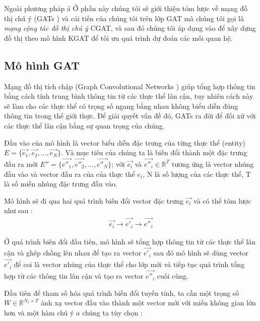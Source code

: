 Ngoài phương pháp á
Ở phần này chúng tôi sẽ giới thiệu tóm lược về mạng đồ thị chú ý (GATs \cite{velivckovic2017graph}) và cải tiến của chúng tôi trên lớp GAT mà chúng tôi gọi là \textit{mạng cộng tác đồ thị chú ý} CGAT, và sau đó chúng tôi áp dụng vào để xây dựng đồ thị theo mô hình KGAT \cite{nathani2019learning} để tối ưu quá trình dự đoán các mối quan hệ. 

\subsection{Mô hình GAT}

Mạng đồ thị tích chập (Graph Convolutional Networks ) giúp tổng hợp thông tin bằng cách tính trung bình thông tin từ các thực thể lân cận, tuy nhiên cách này sẽ làm cho các thực thể có trọng số ngang bằng nhau không biểu diễn đúng thông tin trong thế giới thực. Để giải quyết vấn đề đó, GATs \cite{velivckovic2017graph} ra đời để đối xử với các thực thể lân cận bằng sự quan trọng của chúng.

Đầu vào của mô hình là vector biểu diễn đặc trưng của từng thực thể (entity) $E = \Big\{\overrightarrow{e_1}, \overrightarrow{e_2}, ...,  \overrightarrow{e_N}\Big\}$. Và mục tiêu của chúng ta là biến đổi thành một đặc trưng đầu ra mới $E'' = \Big\{\overrightarrow{e''_1}, \overrightarrow{e''_2}, ...,  \overrightarrow{e''_N}\Big\}$; với $\overrightarrow{e_i}$ và $\overrightarrow{e''_i} \in \mathbb{R}^T$ tương ứng là vector nhúng đầu vào và vector đầu ra của của thực thể $e_i$, N là số lượng của các thực thể, T là số miền nhúng đặc trưng đầu vào.

Mô hình sẽ đi qua hai quá trình biến đổi vector đặc trưng $\overrightarrow{e_i}$ và có thể tóm lược như sau :
\begin{align}
\overrightarrow{e_i} \longrightarrow \overrightarrow{e'_i} \longrightarrow \overrightarrow{e''_i}
\end{align}

Ở quá trình biên đổi đầu tiên, mô hình sẽ tổng hợp thông tin từ các thực thể lân cận và ghép chồng lên nhau để tạo ra vector $\overrightarrow{e'_i}$ sau đó mô hình sẽ dùng vector $\overrightarrow{e'_i}$ để coi là vector nhúng của thực thể cho lớp mới và tiếp tục quá trình tổng hợp từ các thông tin lân cận và tạo ra vector $\overrightarrow{e''_i}$ cuối cùng.

Đầu tiên để tham số hóa quá trình biến đổi tuyến tính, ta cần một trọng số $W \in \mathbb{R}^{N_e \times T}$ ánh xạ vector đầu vào thành một vector mới với miền không gian lớn hơn và một hàm chú ý $a$ chúng ta tùy chọn :

